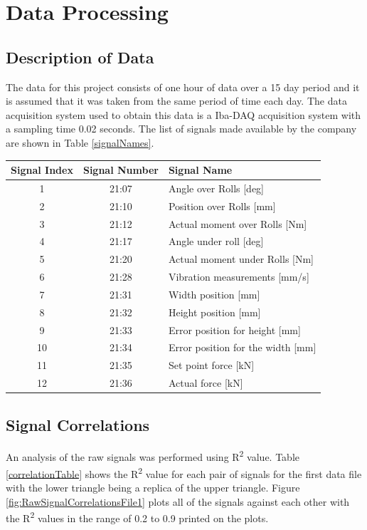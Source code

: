 \documentclass[]{article}
\begin{document}
\section{Data Processing}
\subsection{Description of Data}
The data for this project consists of one hour of data over a 15 day period and it is assumed that it was taken from the same period of time each day. The data acquisition system used to obtain this data is a Iba-DAQ acquisition system with a sampling time 0.02 seconds. The list of signals made available by the company are shown in Table \ref{signalNames}.
\begin{center}
\label{signalNames}
\begin{tabular}{ |c|c|l| }
 \hline
Signal Index & Signal Number & Signal Name \\ 
 \hline
1 & 21:07 & Angle over Rolls [deg] \\
 \hline
2 & 21:10 & Position over Rolls [mm] \\
 \hline
3 & 21:12 & Actual moment over Rolls [Nm] \\
 \hline
4 & 21:17 & Angle under roll [deg] \\
 \hline
5 & 21:20 & Actual moment under Rolls [Nm] \\
 \hline
6 & 21:28 & Vibration measurements [mm/s] \\ 
 \hline              
7 & 21:31 & Width position [mm] \\
 \hline
8 & 21:32 & Height position [mm] \\
 \hline
9 & 21:33 & Error position for height [mm] \\
 \hline
10 & 21:34 & Error position for the width [mm] \\
 \hline
11 & 21:35 & Set point force [kN] \\
 \hline
12 & 21:36 & Actual force [kN] \\
 \hline
\end{tabular}
\end{center}

\subsection{Signal Correlations}
An analysis of the raw signals was performed using R\textsuperscript{2} value. Table \ref{correlationTable} shows the R\textsuperscript{2} value for each pair of signals for the first data file with the lower triangle being a replica of the upper triangle. Figure \ref{fig:RawSignalCorrelationsFile1} plots all of the signals against each other with the R\textsuperscript{2} values in the range of 0.2 to 0.9 printed on the plots. 
\end{document}
